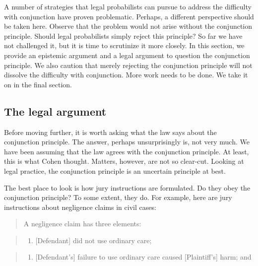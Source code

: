 \documentclass[
  10pt,
  dvipsnames,enabledeprecatedfontcommands]{scrartcl}
\providecommand{\tightlist}{%
  \setlength{\itemsep}{0pt}\setlength{\parskip}{0pt}}
\begin{document}
A number of strategies that legal probabilists can pursue to address the
difficulty with conjunction have proven problematic. Perhaps, a
different perspective should be taken here. Observe that the problem
would not arise without the conjunction principle. Should legal
probabilists simply reject this principle? So far we have not challenged
it, but it is time to scrutinize it more closely. In this section, we
provide an epistemic argument and a legal argument to question the
conjunction principle. We also caution that merely rejecting the
conjunction principle will not dissolve the difficulty with conjunction.
More work needs to be done. We take it on in the final section.

\hypertarget{the-legal-argument}{%
\subsection{The legal argument}\label{the-legal-argument}}

Before moving further, it is worth asking what the law says about the
conjunction principle. The answer, perhaps unsurprisingly is, not very
much. We have been assuming that the law agrees with the conjunction
principle. At least, this is what Cohen thought. Matters, however, are
not so clear-cut. Looking at legal practice, the conjunction principle
is an uncertain principle at best.

The best place to look is how jury instructions are formulated. Do they
obey the conjunction principle? To some extent, they do. For example,
here are jury instructions about negligence claims in civil cases:

\begin{quote}
A negligence claim has three elements:
\end{quote}

\begin{quote}
\begin{enumerate}
\def\labelenumi{\arabic{enumi}.}
\tightlist
\item
  {[}Defendant{]} did not use ordinary care;
\end{enumerate}
\end{quote}

\begin{quote}
\begin{enumerate}
\def\labelenumi{\arabic{enumi}.}
\setcounter{enumi}{1}
\tightlist
\item
  {[}Defendant's{]} failure to use ordinary care caused
  {[}Plaintiff's{]} harm; and
\end{enumerate}
\end{quote}
\end{document}
